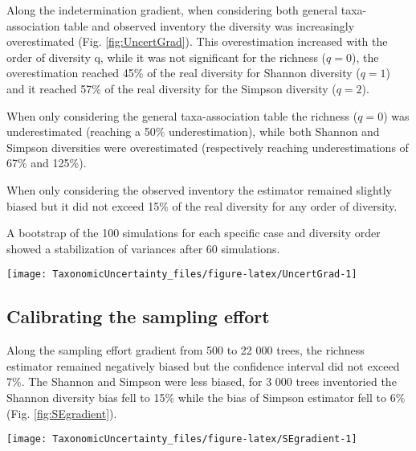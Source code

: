\documentclass[fleqn,10pt]{ArtEcoFoG} %
\begin{document}
Along the indetermination gradient, when considering both general
taxa-association table and observed inventory the diversity was
increasingly overestimated (Fig. \ref{fig:UncertGrad}). This
overestimation increased with the order of diversity q, while it was not
significant for the richness (\(q=0\)), the overestimation reached 45\%
of the real diversity for Shannon diversity (\(q = 1\)) and it reached
57\% of the real diversity for the Simpson diversity (\(q = 2\)).

When only considering the general taxa-association table the richness
(\(q=0\)) was underestimated (reaching a 50\% underestimation), while
both Shannon and Simpson diversities were overestimated (respectively
reaching underestimations of 67\% and 125\%).

When only considering the observed inventory the estimator remained
slightly biased but it did not exceed 15\% of the real diversity for any
order of diversity.

A bootstrap of the 100 simulations for each specific case and diversity
order showed a stabilization of variances after 60 simulations.

\begin{figure*}
\texttt{[image: TaxonomicUncertainty\_files/figure-latex/UncertGrad-1]} \caption{Richness, Shannon and Simpson estimator bias and 95\%confidence interval along an uncertainty gradient with the association frequencies computed from (a) only expert prior, (b) both expert and observation prior and (c) only observation prior.}\label{fig:UncertGrad}
\end{figure*}

\subsection{Calibrating the sampling
effort}\label{calibrating-the-sampling-effort}

Along the sampling effort gradient from 500 to 22 000 trees, the
richness estimator remained negatively biased but the confidence
interval did not exceed 7\%. The Shannon and Simpson were less biased,
for 3 000 trees inventoried the Shannon diversity bias fell to 15\%
while the bias of Simpson estimator fell to 6\% (Fig.
\ref{fig:SEgradient}).

\begin{figure*}
\texttt{[image: TaxonomicUncertainty\_files/figure-latex/SEgradient-1]} \caption{Richness, Shannon and Simpson estimation (upper panels) and bias compared to real diversity (lower panels) along a sampling effort gradient. Shaded areas are the 95\% confidence intervals, vertical plain line stands for the points at 3 000 trees.}\label{fig:SEgradient}
\end{figure*}
\end{document}

